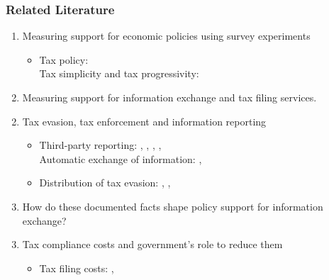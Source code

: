 \documentclass{beamer}
\begin{document}
\begin{frame}
\frametitle{Related Literature}
\begin{enumerate}
    \item Measuring support for economic policies using survey experiments
\begin{itemize}
\scriptsize
    \item Tax policy: {\tiny\textcite{stantcheva2021understanding}} \\[0.1em]
    Tax simplicity and tax progressivity: {\tiny\textcite{tarroux2019value}} 
\end{itemize}
\scriptsize
    \item[$\Rightarrow$] \alert{Measuring support for information exchange and tax filing services.}
\end{enumerate}
\begin{enumerate}
\setcounter{enumi}{1}
\item Tax evasion, tax enforcement and information reporting
\begin{itemize}
\scriptsize
    \item Third-party reporting: {\tiny \textcite{kleven2011unwilling}, \textcite{pomeranz2015no}, \textcite{kleven2016can}, \textcite{slemrod2017does}, \textcite{jensen2022employment}} \\[0.1em]
    Automatic exchange of information: {\tiny \textcite{baselgia2023compliance}, \textcite{boas2024taxing}} \\[0.1em]
    \item Distribution of tax evasion: {\tiny \textcite{johns2010distribution}, \textcite{alstadsaeter2019tax}, \textcite{guyton2021tax}}  
\end{itemize}
\scriptsize
\item[$\Rightarrow$] \alert{How do these documented facts shape policy support for information exchange?}
\vspace{0.2em} 
\end{enumerate}
\begin{enumerate}
\setcounter{enumi}{2}
\item Tax compliance costs and government's role to reduce them 
\begin{itemize}
\scriptsize
    \item Tax filing costs: {\tiny\textcite{blumenthal1992compliance}, \textcite{benzarti2020taxing}}  \\[0.1em]

\end{itemize}
\end{enumerate}
\end{frame}
\end{document}
